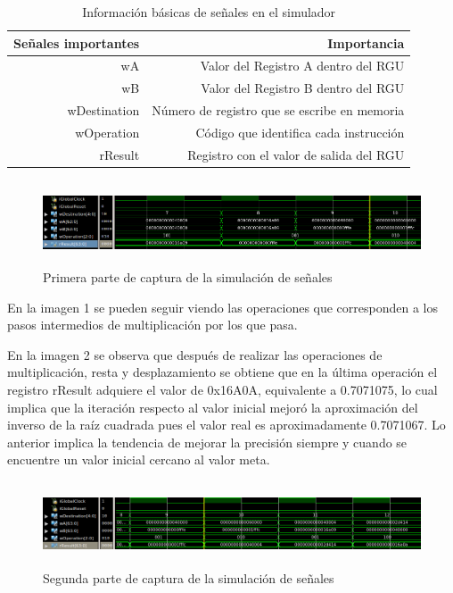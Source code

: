 \begin{table}[htbp]
  \centering
  \caption{Información básicas de señales en el simulador}
    \begin{tabular}{rr}
    \toprule
    Señales importantes & Importancia \\
    \midrule
    wA    & Valor del Registro A dentro del RGU \\
    wB    & Valor del Registro B dentro del RGU \\
    wDestination & Número de registro que se escribe en memoria  \\
    wOperation & Código que identifica cada instrucción \\
    rResult & Registro con el valor de salida del RGU \\
    \bottomrule
    \end{tabular}%
  \label{tab:nombres}%
\end{table}%

\begin{figure}
	\includegraphics[width=1\linewidth, height=2.5cm]{images/Selection_010}
	\caption{Primera parte de captura de la simulación de señales} \label{fig:sim1}
\end{figure}

En la imagen 1 se pueden seguir viendo las operaciones que corresponden a los pasos intermedios de multiplicación por los que pasa.

En la imagen 2 se observa que después de realizar las operaciones de multiplicación, resta y desplazamiento se obtiene que en la última operación el registro rResult adquiere el valor de 0x16A0A, equivalente a 0.7071075, lo cual implica que la iteración respecto al valor inicial mejoró la aproximación del inverso de la raíz cuadrada pues el valor real es aproximadamente 0.7071067. Lo anterior implica la tendencia de mejorar la precisión siempre y cuando se encuentre un valor inicial cercano al valor meta. 

\begin{figure}
	\includegraphics[width=1\linewidth, height=2.5cm]{images/Selection_011}
	\caption{Segunda parte de captura de la simulación de señales} \label{fig:sim2}
\end{figure}

